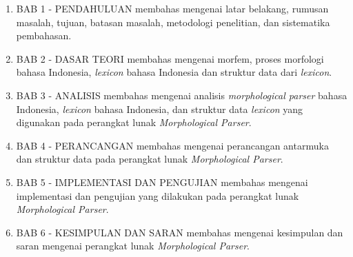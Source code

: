 \begin{enumerate}
	\item BAB 1 - PENDAHULUAN membahas mengenai latar belakang, rumusan masalah, tujuan, batasan masalah, metodologi penelitian, dan sistematika pembahasan.
	\item BAB 2 - DASAR TEORI membahas mengenai morfem, proses morfologi bahasa Indonesia, {\it lexicon} bahasa Indonesia dan struktur data dari {\it lexicon}.
	\item BAB 3 - ANALISIS membahas mengenai analisis \textit{morphological parser} bahasa Indonesia, {\it lexicon} bahasa Indonesia, dan struktur data {\it lexicon} yang digunakan pada perangkat lunak {\it Morphological Parser}.
	\item BAB 4 - PERANCANGAN membahas mengenai perancangan antarmuka dan struktur data pada perangkat lunak {\it Morphological Parser}.
	\item BAB 5 - IMPLEMENTASI DAN PENGUJIAN membahas mengenai implementasi dan pengujian yang dilakukan pada perangkat lunak {\it Morphological Parser}.
	\item BAB 6 - KESIMPULAN DAN SARAN membahas mengenai kesimpulan dan saran mengenai perangkat lunak {\it Morphological Parser}.
\end{enumerate}